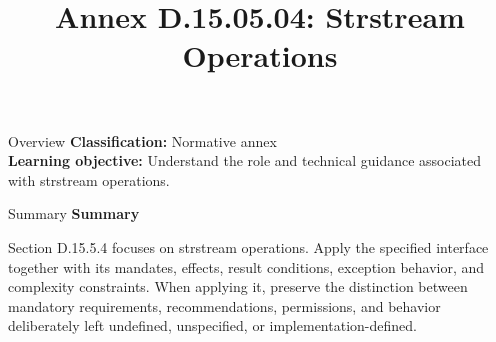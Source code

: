 \documentclass[10pt,letterpaper]{article}
\title{Annex D.15.05.04: Strstream Operations}
\author{}
\date{}
\begin{document}
\maketitle
\begin{CornellOverviewBox}{Overview}
\textbf{Classification:} Normative annex\\[2pt]
\textbf{Learning objective:} Understand the role and technical guidance associated with strstream operations.
\end{CornellOverviewBox}\begin{CornellSummaryBox}{Summary}
{\sffamily\bfseries\color{Accent} Summary}\par\vspace{3pt}Section D.15.5.4 focuses on strstream operations. Apply the specified interface together with its mandates, effects, result conditions, exception behavior, and complexity constraints. When applying it, preserve the distinction between mandatory requirements, recommendations, permissions, and behavior deliberately left undefined, unspecified, or implementation-defined.
\end{CornellSummaryBox}
\end{document}
